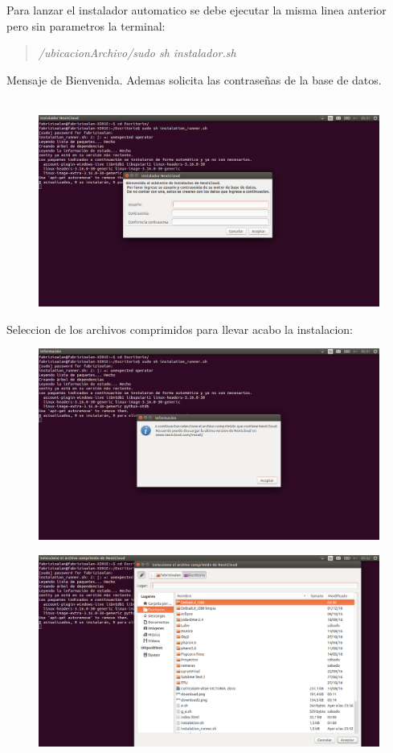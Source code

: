 \documentclass[11pt]{article}
\begin{document}
Para lanzar el instalador automatico se debe ejecutar la misma linea anterior pero sin parametros la terminal:\\
\begin{quote}
\emph{/ubicacionArchivo/sudo sh instalador.sh}
\end{quote}

Mensaje de Bienvenida. Ademas solicita las contraseñas de la base de datos.\\\\
\begin{figure}[htp]
\centering
\includegraphics[scale=0.30]{instalador.png}
\caption{}
\label{}
\end{figure}

Seleccion de los archivos comprimidos para llevar acabo la instalacion:

\begin{figure}[htp]
\centering
\includegraphics[scale=0.30]{selec.png}
\caption{}
\end{figure}
\begin{figure}[htp]
\centering
\includegraphics[scale=0.30]{selec2.png}
\end{figure}
\end{document}
